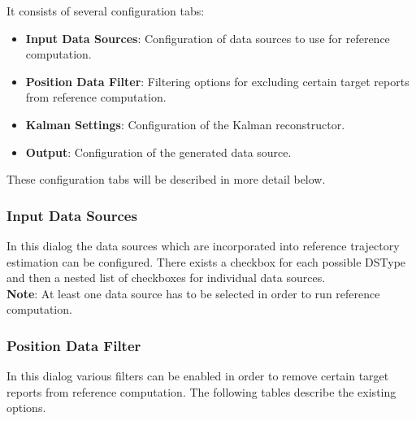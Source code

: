 It consists of several configuration tabs:

\begin{itemize}
    \item \textbf{Input Data Sources}: Configuration of data sources to use for reference computation.
    \item \textbf{Position Data Filter}: Filtering options for excluding certain target reports from reference computation.
    \item \textbf{Kalman Settings}: Configuration of the Kalman reconstructor.
    \item \textbf{Output}: Configuration of the generated data source. \\
\end{itemize}

These configuration tabs will be described in more detail below.

\subsubsection{Input Data Sources}


In this dialog the data sources which are incorporated into reference trajectory estimation can be configured.
There exists a checkbox for each possible DSType and then a nested list of checkboxes for individual data sources. \\

\textbf{Note}: At least one data source has to be selected in order to run reference computation.

\subsubsection{Position Data Filter}


In this dialog various filters can be enabled in order to remove certain target reports from reference computation. 
The following tables describe the existing options.

